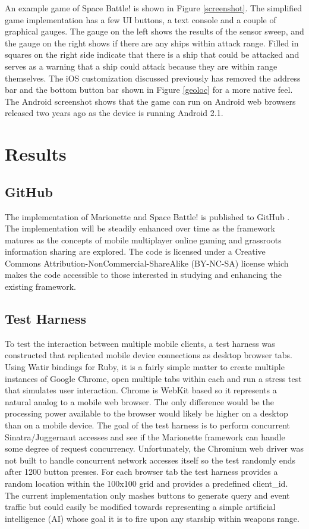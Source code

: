 \documentclass[12pt]{report}	%
\theoremstyle{definition}
\theoremstyle{remark}
\begin{document}
An example game of Space Battle! is shown in Figure
\ref{screenshot}. The simplified game implementation
has a few UI buttons, a text console and a couple of graphical gauges.
The gauge on the left shows the results of the sensor sweep, and the
gauge on the right shows if there are any ships within attack range.
Filled in squares on the right side indicate that there is a ship that
could be attacked and serves as a warning that a ship could attack
because they are within range themselves. The iOS customization
discussed previously has removed the address bar and the bottom button
bar shown in Figure \ref{geoloc} for a more native
feel. The Android screenshot shows that the game can run on Android web
browsers released two years ago as the device is running Android 2.1.

\chapter{Results}

\section{GitHub}

The implementation of Marionette and Space Battle! is published to
GitHub \cite{marionette}. The implementation will be
steadily enhanced over time as the framework matures as the concepts of
mobile multiplayer online gaming and grassroots information sharing are
explored. The code is licensed under a Creative Commons
Attribution-NonCommercial-ShareAlike (BY-NC-SA) license which makes the
code accessible to those interested in studying and enhancing the
existing framework.

\section{Test Harness}

To test the interaction between multiple mobile clients, a test harness
was constructed that replicated mobile device connections as desktop
browser tabs. Using Watir bindings for Ruby, it is a fairly simple
matter to create multiple instances of Google Chrome, open multiple tabs
within each and run a stress test that simulates user interaction.
Chrome is WebKit based so it represents a natural analog to a mobile web
browser. The only difference would be the processing power available to
the browser would likely be higher on a desktop than on a mobile device.
The goal of the test harness is to perform concurrent Sinatra/Juggernaut
accesses and see if the Marionette framework can handle some degree of
request concurrency. Unfortunately, the Chromium web driver was not
built to handle concurrent network accesses itself so the test randomly
ends after 1200 button presses. For each browser tab
the test harness provides a random location within the 100x100 grid and
provides a predefined client\_id. The current implementation only mashes
buttons to generate query and event traffic but could easily be modified
towards representing a simple artificial intelligence (AI) whose goal it
is to fire upon any starship within weapons range.
\end{document}
